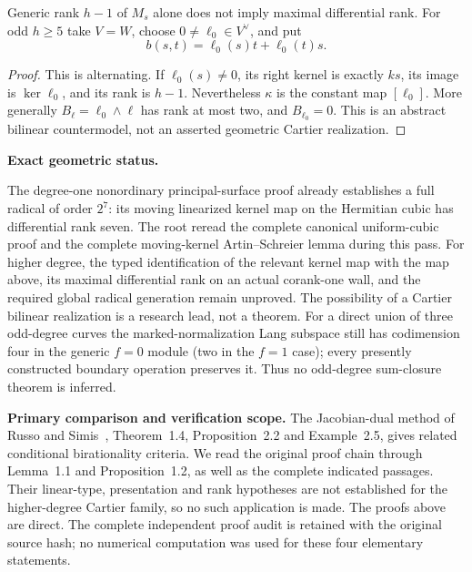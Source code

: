 \begin{example}
\label{ex:root-kernel-compression-countermodel}
Generic rank $h-1$ of $M_s$ alone does not imply maximal differential
rank. For odd $h\geq5$ take $V=W$, choose $0\ne\ell_0\in V^\vee$,
and put
\[
                  b(s,t)=\ell_0(s)t+\ell_0(t)s.
\]
\end{example}
\begin{proof}
This is alternating. If $\ell_0(s)\ne0$, its right kernel is exactly
$ks$, its image is $\ker\ell_0$, and its rank is $h-1$.
Nevertheless $\kappa$ is the constant map $[\ell_0]$.
More generally $B_\ell=\ell_0\wedge\ell$ has rank at most two,
and $B_{\ell_0}=0$. This is an abstract bilinear countermodel, not
an asserted geometric Cartier realization.
\end{proof}

\par\smallskip\noindent\textbf{Exact geometric status.}

The degree-one nonordinary principal-surface proof already establishes
a full radical of order $2^7$: its moving linearized kernel map on
the Hermitian cubic has differential rank seven. The root reread the
complete canonical uniform-cubic proof and the complete moving-kernel
Artin--Schreier lemma during this pass. For higher degree, the typed
identification of the relevant kernel map with the map above, its
maximal differential rank on an actual corank-one wall, and the
required global radical generation remain unproved. The possibility
of a Cartier bilinear realization is a research lead, not a theorem.
For a direct union of three odd-degree curves the marked-normalization
Lang subspace still has codimension four in the generic $f=0$ module
(two in the $f=1$ case); every presently constructed boundary operation
preserves it. Thus no odd-degree sum-closure theorem is inferred.

\par\smallskip\noindent\textbf{Primary comparison and verification scope.}
The Jacobian-dual method of Russo and Simis~\cite{RussoSimis2001Birational},
Theorem~1.4, Proposition~2.2 and Example~2.5, gives related conditional
birationality criteria. We read the original proof chain through
Lemma~1.1 and Proposition~1.2, as well as the complete indicated passages.
Their linear-type, presentation and rank hypotheses are not established
for the higher-degree Cartier family, so no such application is made.
The proofs above are direct. The complete independent proof audit is
retained with the original source hash; no numerical computation was
used for these four elementary statements.
